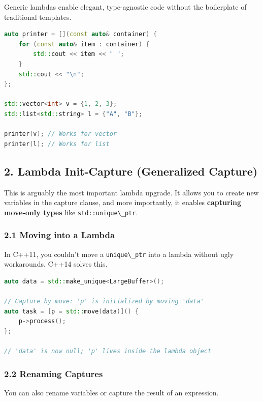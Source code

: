 Generic lambdas enable elegant, type-agnostic code without the
boilerplate of traditional templates.

\begin{lstlisting}[language={C++}]
auto printer = [](const auto& container) {
    for (const auto& item : container) {
        std::cout << item << " ";
    }
    std::cout << "\n";
};

std::vector<int> v = {1, 2, 3};
std::list<std::string> l = {"A", "B"};

printer(v); // Works for vector
printer(l); // Works for list
\end{lstlisting}

\hypertarget{lambda-init-capture-generalized-capture}{%
\subsection{2. Lambda Init-Capture (Generalized
Capture)}\label{lambda-init-capture-generalized-capture}}

This is arguably the most important lambda upgrade. It allows you to
create new variables in the capture clause, and more importantly, it
enables \textbf{capturing move-only types} like
\passthrough{\lstinline!std::unique\_ptr!}.

\hypertarget{moving-into-a-lambda}{%
\subsubsection{2.1 Moving into a Lambda}\label{moving-into-a-lambda}}

In C++11, you couldn't move a \passthrough{\lstinline!unique\_ptr!} into
a lambda without ugly workarounds. C++14 solves this.

\begin{lstlisting}[language={C++}]
auto data = std::make_unique<LargeBuffer>();

// Capture by move: 'p' is initialized by moving 'data'
auto task = [p = std::move(data)]() {
    p->process();
};

// 'data' is now null; 'p' lives inside the lambda object
\end{lstlisting}

\hypertarget{renaming-captures}{%
\subsubsection{2.2 Renaming Captures}\label{renaming-captures}}

You can also rename variables or capture the result of an expression.

